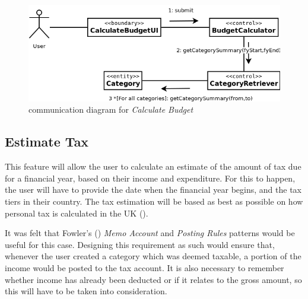 \begin{figure}[ht!]
  \begin{center}
    \includegraphics[width=14cm]{./contents/img/Comm_Diagram_-_Calculate_Budget.png}
  \end{center}
  \caption{communication diagram for \emph{Calculate Budget}}
  \label{fig:CommDiagram.CalculateBudget}
\end{figure}
\FloatBarrier



\subsection{Estimate Tax} \label{sec:AnalysisAndDesign.EstimateTax}

This feature will allow the user to calculate an estimate of the amount of tax
due for a financial year, based on their income and expenditure. For this to
happen, the user will have to provide the date when the financial year begins,
and the tax tiers in their country. The tax estimation will be based as best as
possible on how personal tax is calculated in the UK
(\cite[][]{hmrc2018personaltax}). 

It was felt that Fowler's (\citeyear[][Session.~6.4-6.5]{fowler1997analysis})
\emph{Memo Account} and \emph{Posting Rules} patterns would be useful for this
case. Designing this requirement as such would ensure that, whenever the user
created a category which was deemed taxable, a portion of the income would be
posted to the tax account. It is also necessary to remember whether income has
already been deducted or if it relates to the gross amount, so this will have
to be taken into consideration. 



